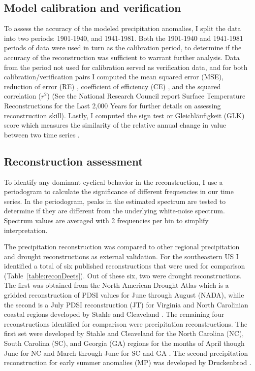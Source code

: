 \subsection{Model calibration and verification}

To assess the accuracy of the modeled precipitation anomalies,  I  split the data into two periods: 1901-1940, and 1941-1981. Both the 1901-1940 and 1941-1981 periods of data were used in turn as the calibration period, to determine if the accuracy of the reconstruction was sufficient to warrant further analysis. Data from the period not used for calibration served as verification data, and for both calibration/verification pairs I computed the mean squared error (MSE)\label{sym:MSE}, reduction of error (RE)\label{sym:RE} \cite{fritts1976tree}, coefficient of efficiency (CE)\label{sym:CE} \cite{cook1994spatial}, and the squared correlation ($r^2$)\label{sym:r2} (See the National Research Council report Surface Temperature Reconstructions for the Last 2,000 Years \cite{national2006surface} for further details on assessing reconstruction skill). Lastly, I computed the sign test or Gleichl\"{a}ufigkeit (GLK)\label{sym:GLK} score which measures the similarity of the relative annual change in value between two time series \cite{speer2010fundamentals, schweingruber1988tree}.  

\subsection{Reconstruction assessment}

To identify any dominant cyclical behavior in the reconstruction,  I  use a periodogram to calculate the significance of different frequencies in our time series. In the periodogram, peaks in the estimated spectrum are tested to determine if they are different from the underlying white-noise spectrum. Spectrum values are averaged with 2 frequencies per bin to simplify interpretation.  

The precipitation reconstruction was compared to other regional precipitation and drought reconstructions as external validation. For the southeastern US  I  identified a total of six published reconstructions that were used for comparison (Table~\ref{table:reconDeets}). Out of these six, two were drought reconstructions. The first was obtained from the North American Drought Atlas \cite{cook1999drought} which is a gridded reconstruction of PDSI values for June through August (NADA)\label{sym:NADA}, while the second is a July PDSI reconstruction (JT)\label{sym:JT} for Virginia and North Carolinian coastal regions developed by Stahle and Cleaveland \cite{stahle1998lost}. The remaining four reconstructions identified for comparison were precipitation reconstructions. The first set were developed by Stahle and Cleaveland for the North Carolina (NC)\label{sym:NC}, South Carolina\label{sym:SC} (SC), and Georgia\label{sym:GA} (GA) regions for the months of April though June for NC and March through June for SC and GA \cite{stahle1992reconstruction}. The second precipitation reconstruction for early summer anomalies (MP)\label{sym:MP} was developed by Druckenbrod \cite{druckenbrod2003late}. 

